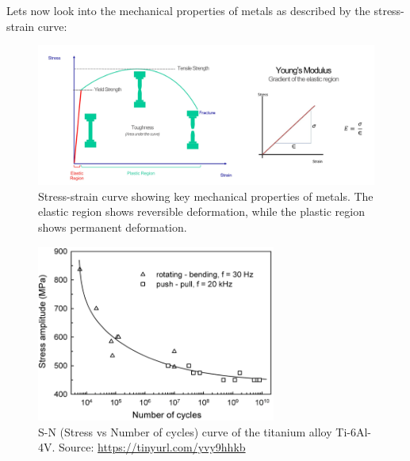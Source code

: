 \documentclass[12pt]{article}
\begin{document}
Lets now look into the mechanical properties of metals as described by the
stress-strain curve:
\begin{figure}[htbp]
    \centering
    \includegraphics[width=1\textwidth]{figures/chapter_2/mechanical_properties.png}
    \caption{Stress-strain curve showing key mechanical properties of metals. The elastic region shows reversible deformation, while the plastic region shows permanent deformation.}\label{fig:mechanical_properties}
\end{figure}

\begin{figure}[htbp]
    \centering
    \includegraphics[width=0.7\textwidth]{figures/chapter_2/fatigue_curve.png}
    \caption{S-N (Stress vs Number of cycles) curve of the titanium alloy Ti-6Al-4V. Source: \url{https://tinyurl.com/yvy9hhkb}}\label{fig:fatigue_curve}
\end{figure}
\end{document}
